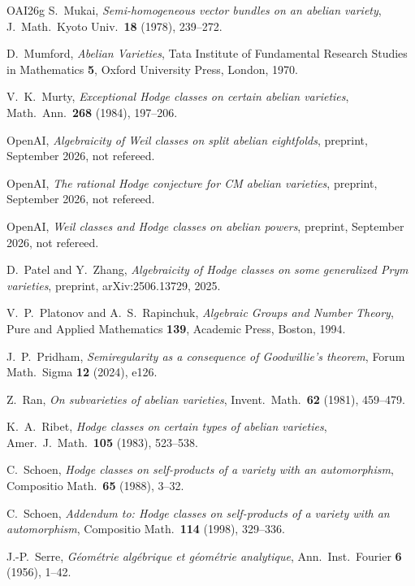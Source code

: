 \begin{thebibliography}{OAI26g}
S.~Mukai, \emph{Semi-homogeneous vector bundles on an abelian variety},
J.\ Math.\ Kyoto Univ.\ \textbf{18} (1978), 239--272.

D.~Mumford, \emph{Abelian Varieties}, Tata Institute of Fundamental
Research Studies in Mathematics \textbf{5}, Oxford University Press,
London, 1970.

V.~K.~Murty, \emph{Exceptional Hodge classes on certain abelian varieties},
Math.\ Ann.\ \textbf{268} (1984), 197--206.

OpenAI, \emph{Algebraicity of Weil classes on split abelian eightfolds},
preprint, September 2026, not refereed.

OpenAI, \emph{The rational Hodge conjecture for CM abelian varieties},
preprint, September 2026, not refereed.

OpenAI, \emph{Weil classes and Hodge classes on abelian powers}, preprint,
September 2026, not refereed.

D.~Patel and Y.~Zhang, \emph{Algebraicity of Hodge classes on some
generalized Prym varieties}, preprint, arXiv:2506.13729, 2025.

V.~P.~Platonov and A.~S.~Rapinchuk, \emph{Algebraic Groups and Number
Theory}, Pure and Applied Mathematics \textbf{139}, Academic Press, Boston,
1994.

J.~P.~Pridham, \emph{Semiregularity as a consequence of Goodwillie's
theorem}, Forum Math.\ Sigma \textbf{12} (2024), e126.

Z.~Ran, \emph{On subvarieties of abelian varieties}, Invent.\ Math.\
\textbf{62} (1981), 459--479.

K.~A.~Ribet, \emph{Hodge classes on certain types of abelian varieties},
Amer.\ J.\ Math.\ \textbf{105} (1983), 523--538.

C.~Schoen, \emph{Hodge classes on self-products of a variety with an
automorphism}, Compositio Math.\ \textbf{65} (1988), 3--32.

C.~Schoen, \emph{Addendum to: Hodge classes on self-products of a variety
with an automorphism}, Compositio Math.\ \textbf{114} (1998), 329--336.

J.-P.~Serre, \emph{G\'eom\'etrie alg\'ebrique et g\'eom\'etrie analytique},
Ann.\ Inst.\ Fourier \textbf{6} (1956), 1--42.


\end{thebibliography}
